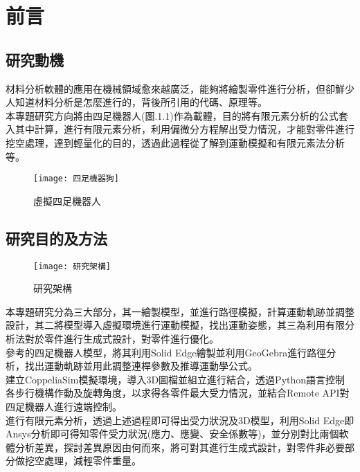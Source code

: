 \chapter{前言}
\renewcommand{\baselinestretch}{10.0} %
\setcounter{page}{1}  %
\fontsize{14pt}{2.5pt}\sectionef

\section{研究動機}
材料分析軟體的應用在機械領域愈來越廣泛，能夠將繪製零件進行分析，但卻鮮少人知道材料分析是怎麼進行的，背後所引用的代碼、原理等。\\
本專題研究方向將由四足機器人(圖.1.1)作為載體，目的將有限元素分析的公式套入其中計算，進行有限元素分析，利用偏微分方程解出受力情況，才能對零件進行挖空處理，達到輕量化的目的，透過此過程從了解到運動模擬和有限元素法分析等。\\

\begin{figure}[hbt!]
\center
\texttt{[image: 四足機器狗]}
\caption{\Large 虛擬四足機器人}\label{四足機器狗}
\end{figure}
\newpage
\section{研究目的及方法}
\begin{figure}[hbt!]
\begin{center}
\texttt{[image: 研究架構]}
\caption{\Large 研究架構}\label{研究架構}
\end{center}
\end{figure}
本專題研究分為三大部分，其一繪製模型，並進行路徑模擬，計算運動軌跡並調整設計，其二將模型導入虛擬環境進行運動模擬，找出運動姿態，其三為利用有限分析法對於零件進行生成式設計，對零件進行優化。\\
參考的四足機器人模型，將其利用Solid Edge繪製並利用GeoGebra進行路徑分析，找出運動軌跡並用此調整連桿參數及推導運動學公式。\\
建立CoppeliaSim模擬環境，導入3D圖檔並組立進行結合，透過Python語言控制各步行機構作動及旋轉角度，以求得各零件最大受力情況，並結合Remote API對四足機器人進行遠端控制。\\
進行有限元素分析，透過上述過程即可得出受力狀況及3D模型，利用Solid Edge即Ansys分析即可得知零件受力狀況(應力、應變、安全係數等)，並分別對比兩個軟體分析差異，探討差異原因由何而來，將可對其進行生成式設計，對零件非必要部分做挖空處理，減輕零件重量。\\

